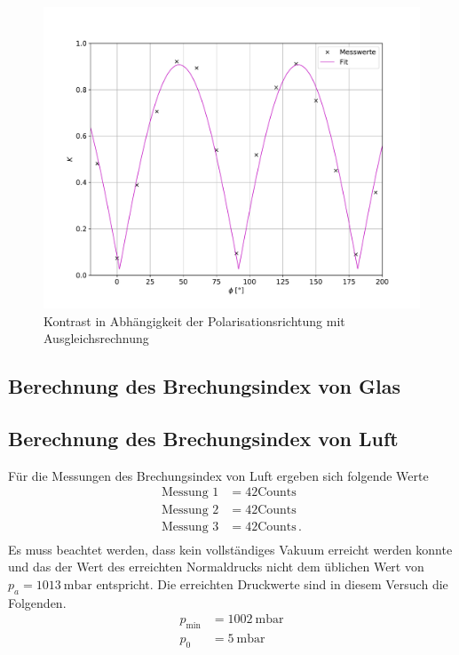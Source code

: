 \begin{figure}[H]
  \centering
  \includegraphics[width=\textwidth]{kontrast.pdf}
  \caption{Kontrast in Abhängigkeit der Polarisationsrichtung mit
  Ausgleichsrechnung}
  \label{fig:kontrast}
\end{figure}
\subsection{Berechnung des Brechungsindex von Glas}

\subsection{Berechnung des Brechungsindex von Luft}

Für die Messungen des Brechungsindex von Luft ergeben sich folgende Werte
\begin{align*}
  \text{Messung 1} &= 42 \text{Counts} \\
  \text{Messung 2} &= 42 \text{Counts} \\
  \text{Messung 3} &= 42 \text{Counts} \, . \\
\end{align*}
Es muss beachtet werden, dass kein vollständiges Vakuum erreicht werden konnte
und das der Wert des erreichten Normaldrucks nicht dem üblichen Wert von
$p_a= \SI{1013}{\milli\bar}$ entspricht. Die erreichten Druckwerte sind in
diesem Versuch die Folgenden.
\begin{align*}
  p_{\text{min}} &= \SI{1002}{\milli\bar} \\
  p_0            &= \SI{5}{\milli\bar} \\
\end{align*}

